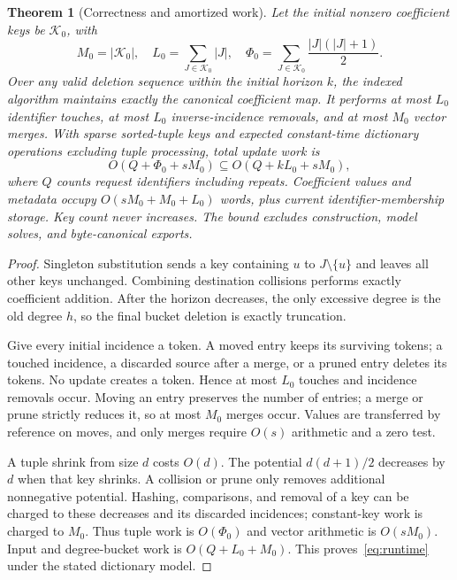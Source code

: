 \documentclass[11pt,a4paper]{article}
\newtheorem{theorem}{Theorem}[section]
\theoremstyle{definition}\newtheorem{definition}[theorem]{Definition}
\newcommand{\minus}{\setminus}
\begin{document}
\begin{theorem}[Correctness and amortized work]\label{thm:algorithm}
Let the initial nonzero coefficient keys be $\mathcal K_0$, with
\[
 M_0=|\mathcal K_0|,\quad L_0=\sum_{J\in\mathcal K_0}|J|,\quad
 \Phi_0=\sum_{J\in\mathcal K_0}\frac{|J|(|J|+1)}2.
\]
Over any valid deletion sequence within the initial horizon $k$, the indexed algorithm maintains exactly the canonical coefficient map. It performs at most $L_0$ identifier touches, at most $L_0$ inverse-incidence removals, and at most $M_0$ vector merges. With sparse sorted-tuple keys and expected constant-time dictionary operations excluding tuple processing, total update work is
\begin{equation}\label{eq:runtime}
 O(Q+\Phi_0+sM_0)\subseteq O(Q+kL_0+sM_0),
\end{equation}
where $Q$ counts request identifiers including repeats. Coefficient values and metadata occupy $O(sM_0+M_0+L_0)$ words, plus current identifier-membership storage. Key count never increases. The bound excludes construction, model solves, and byte-canonical exports.
\end{theorem}
\begin{proof}
Singleton substitution sends a key containing $u$ to $J\minus\{u\}$ and leaves all other keys unchanged. Combining destination collisions performs exactly coefficient addition. After the horizon decreases, the only excessive degree is the old degree $h$, so the final bucket deletion is exactly truncation.

Give every initial incidence a token. A moved entry keeps its surviving tokens; a touched incidence, a discarded source after a merge, or a pruned entry deletes its tokens. No update creates a token. Hence at most $L_0$ touches and incidence removals occur. Moving an entry preserves the number of entries; a merge or prune strictly reduces it, so at most $M_0$ merges occur. Values are transferred by reference on moves, and only merges require $O(s)$ arithmetic and a zero test.

A tuple shrink from size $d$ costs $O(d)$. The potential $d(d+1)/2$ decreases by $d$ when that key shrinks. A collision or prune only removes additional nonnegative potential. Hashing, comparisons, and removal of a key can be charged to these decreases and its discarded incidences; constant-key work is charged to $M_0$. Thus tuple work is $O(\Phi_0)$ and vector arithmetic is $O(sM_0)$. Input and degree-bucket work is $O(Q+L_0+M_0)$. This proves~\eqref{eq:runtime} under the stated dictionary model.
\end{proof}
\end{document}
